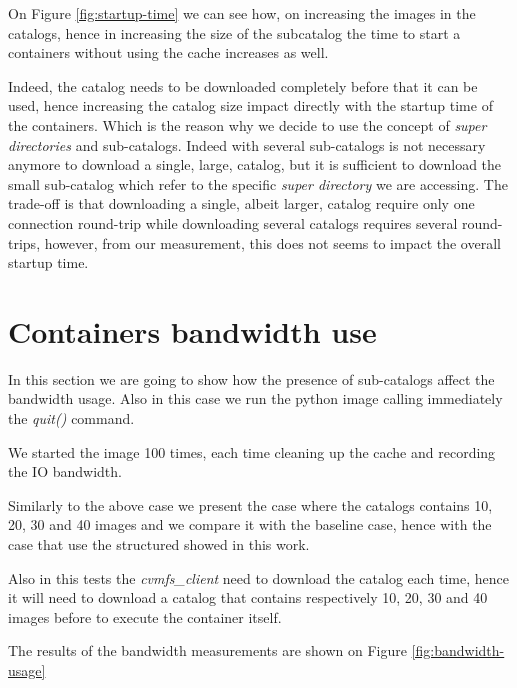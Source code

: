 On Figure \ref{fig:startup-time} we can see how, on increasing the images
in the catalogs, hence in increasing the size of the subcatalog the
time to start a containers without using the cache increases as well.

Indeed, the catalog needs to be downloaded completely before that it can be
used, hence increasing the catalog size impact directly with the startup time
of the containers. Which is the reason why we decide to use the concept of
\textit{super directories} and sub-catalogs. Indeed with several sub-catalogs
is not necessary anymore to download a single, large, catalog, but it is
sufficient to download the small sub-catalog which refer to the specific
\textit{super directory} we are accessing.  The trade-off is that downloading a
single, albeit larger, catalog require only one connection round-trip while
downloading several catalogs requires several round-trips, however, from our
measurement, this does not seems to impact the overall startup time.

\section{Containers bandwidth use}

In this section we are going to show how the presence of sub-catalogs affect
the bandwidth usage. Also in this case we run the python image calling
immediately the \textit{quit()} command.

We started the image 100 times, each time cleaning up the cache and recording
the IO bandwidth.

Similarly to the above case we present the case where the catalogs contains 10,
20, 30 and 40 images and we compare it with the baseline case, hence with the
case that use the structured showed in this work. 

Also in this tests the \textit{cvmfs\_client} need to download the catalog each
time, hence it will need to download a catalog that contains respectively 10,
20, 30 and 40 images before to execute the container itself.

The results of the bandwidth measurements are shown on Figure \ref{fig:bandwidth-usage}

